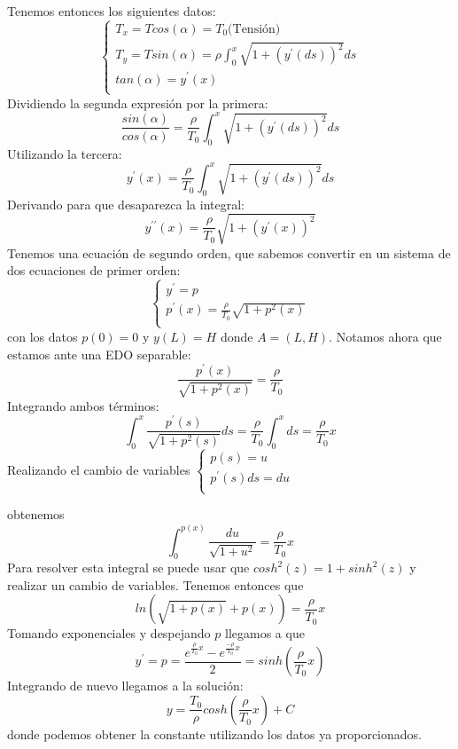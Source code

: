 \documentclass{mathnotes}
\begin{document}
\begin{example}
Tenemos entonces los siguientes datos:
\begin{equation*}
  \left\lbrace
  \begin{array}{l}
     T_x = Tcos(\alpha)=T_0 \text{(Tensión)} \\
     T_y = Tsin(\alpha) = \rho\int_0^x \sqrt{1+(y^\prime(ds))^2}ds \\
     tan(\alpha) = y^\prime(x)\\
  \end{array}
  \right.
\end{equation*}
Dividiendo la segunda expresión por la primera: 
$$\frac{sin(\alpha)}{cos(\alpha)} = \frac{\rho}{T_0}\int_0^x \sqrt{1+(y^\prime(ds))^2}ds$$
Utilizando la tercera:
$$y^\prime(x) = \frac{\rho}{T_0}\int_0^x \sqrt{1+(y^\prime(ds))^2}ds$$
Derivando para que desaparezca la integral:
$$y^{\prime\prime}(x) = \frac{\rho}{T_0}\sqrt{1+(y^\prime(x))^2}$$
Tenemos una ecuación de segundo orden, que sabemos convertir en un sistema de dos ecuaciones de primer orden:
\begin{equation*}
  \left\lbrace
  \begin{array}{l}
     y^\prime = p \\
     p^\prime(x) = \frac{\rho}{T_0}\sqrt{1+p^2(x)} \\
  \end{array}
  \right.
\end{equation*}
con los datos $p(0) = 0$ y $y(L) = H$ donde $A = (L,H)$.
Notamos ahora que estamos ante una EDO separable:
$$\frac{p^\prime(x)}{\sqrt{1+p^2(x)}} = \frac{\rho}{T_0}$$
Integrando ambos términos:
$$\int_0^x \frac{p^\prime(s)}{\sqrt{1+p^2(s)}}ds = \frac{\rho}{T_0}\int_0^x ds = \frac{\rho}{T_0}x$$
Realizando el cambio de variables $
  \left\lbrace
  \begin{array}{l}
     p(s) = u \\
     p^\prime(s)ds = du \\
  \end{array}
  \right.
$

obtenemos $$\int_0^{p(x)} \frac{du}{\sqrt{1+u^2}} = \frac{\rho}{T_0} x $$
Para resolver esta integral se puede usar que $cosh^2(z) = 1+ sinh^2(z)$ y realizar un cambio de variables. Tenemos entonces que $$ln(\sqrt{1+p(x)} + p(x)) = \frac{\rho}{T_0} x $$
Tomando exponenciales y despejando $p$ llegamos a que
$$y^\prime = p = \frac{e^{\frac{\rho}{T_0} x }-e^{\frac{-\rho}{T_0} x }}{2} = sinh(\frac{\rho}{T_0} x )$$
Integrando de nuevo llegamos a la solución:
$$y = \frac{T_0}{\rho}cosh(\frac{\rho}{T_0} x ) + C$$
donde podemos obtener la constante utilizando los datos ya proporcionados.
\end{example}
\end{document}
